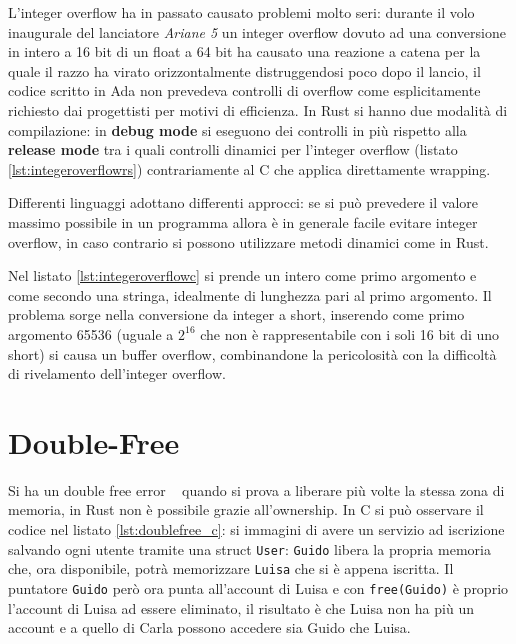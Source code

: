\documentclass[Lau,binding=0.6cm]{sapthesis}
\newcommand{\textcode}[1]{\colorbox{backcolour}{\texttt{#1}}}
\begin{document}
L'integer overflow ha in passato causato problemi molto seri: durante il volo inaugurale del lanciatore \textit{Ariane 5} un integer overflow dovuto ad una conversione in intero a 16 bit di un float a 64 bit ha causato una reazione a catena per la quale il razzo ha virato orizzontalmente distruggendosi poco dopo il lancio, il codice scritto in Ada non prevedeva controlli di overflow come esplicitamente richiesto dai progettisti per motivi di efficienza. 
In Rust si hanno due modalità di compilazione: in \textbf{debug mode} si eseguono dei controlli in più rispetto alla \textbf{release mode} tra i quali controlli dinamici per l'integer overflow (listato \ref{lst:integeroverflowrs}) contrariamente al C che applica direttamente wrapping.

Differenti linguaggi adottano differenti approcci: se si può prevedere il valore massimo possibile in un programma allora è in generale facile evitare integer overflow, in caso contrario si possono utilizzare metodi dinamici come in Rust. 




Nel listato \ref{lst:integeroverflowc} si prende un intero come primo argomento e come secondo una stringa, idealmente di lunghezza pari al primo argomento.
Il problema sorge nella conversione da integer a short, inserendo come primo argomento 65536 (uguale a $ 2^{16} $ che non è rappresentabile con i soli 16 bit di uno short) si causa un buffer overflow, combinandone la pericolosità con la difficoltà di rivelamento dell'integer overflow.




\section{Double-Free} \label{sec:double_free}
Si ha un double free error ~\cite[10.4.4]{gollmann:computersecurity} quando si prova a liberare più volte la stessa zona di memoria, in Rust non è possibile grazie all'ownership.
In C si può osservare il codice nel listato \ref{lst:doublefree_c}: si immagini di avere un servizio ad iscrizione salvando ogni utente tramite una struct \textcode{User}: \textcode{Guido} libera la propria memoria che, ora disponibile, potrà memorizzare \textcode{Luisa} che si è appena iscritta. 
Il puntatore \textcode{Guido} però ora punta all'account di Luisa e con \textcode{free(Guido)} è proprio l'account di Luisa ad essere eliminato, il risultato è che Luisa non ha più un account e a quello di Carla possono accedere sia Guido che Luisa.
\end{document}
